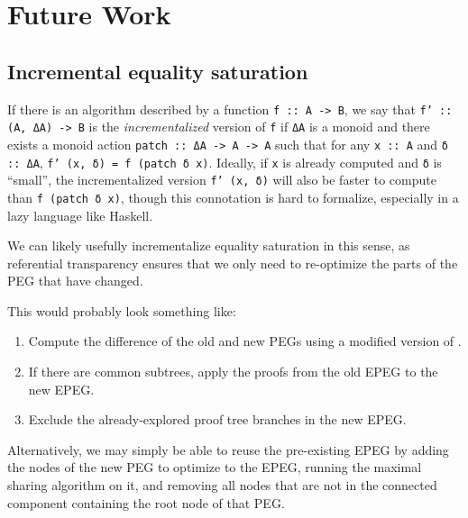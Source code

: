 \documentclass[11pt]{report}
\newcommand{\haskell}[1]{\texttt{#1}}
\begin{document}

\chapter{Future Work}
\label{sec:future-work}

\section{Incremental equality saturation}
\label{sec:incremental-eqsat}

If there is an algorithm described by a function \haskell{f :: A -> B}, we say
that \haskell{f' :: (A, ΔA) -> B} is the \textit{incrementalized} version of
\haskell{f} if \haskell{ΔA} is a monoid and there exists a monoid action
\haskell{patch :: ΔA -> A -> A} such that for any \haskell{x :: A} and
\haskell{δ :: ΔA},
\texttt{\haskell{f'} (\haskell{x}, \haskell{δ}) = \haskell{f} (\haskell{patch} \haskell{δ} \haskell{x})}.
Ideally, if \haskell{x} is already computed and \haskell{δ} is ``small'', the
incrementalized version \texttt{\haskell{f'} (\haskell{x}, \haskell{δ})} will
also be faster to compute than
\texttt{\haskell{f} (\haskell{patch} \haskell{δ} \haskell{x})},
though this connotation is hard to formalize, especially in a
lazy language like Haskell.

We can likely usefully incrementalize equality saturation in this sense, as
referential transparency ensures that we only need to re-optimize the parts of
the PEG that have changed.

This would probably look something like:

\begin{enumerate}
\item {%
  Compute the difference of the old and new PEGs using
  a modified version of \cite{lempsink-2009}.
}
\item {%
  If there are common subtrees, apply the proofs from the old EPEG
  to the new EPEG.
}
\item {%
  Exclude the already-explored proof tree branches in the new EPEG.
}
\end{enumerate}

Alternatively, we may simply be able to reuse the pre-existing EPEG by adding
the nodes of the new PEG to optimize to the EPEG, running the maximal sharing
algorithm on it, and removing all nodes that are not in the connected component
containing the root node of that PEG.
\end{document}
